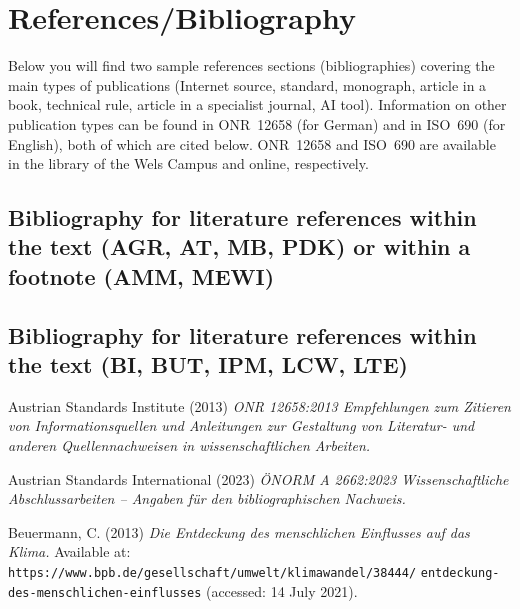 \chapter{References/Bibliography}
\label{sec: Bibliography}
Below you will find two sample references sections (bibliographies) covering the main types of publications (Internet source, standard, monograph, article in a book, technical rule, article in a specialist journal, AI tool). Information on other publication types can be found in ONR~12658 (for German) and in ISO~690 (for English), both of which are cited below. ONR~12658 and ISO~690 are available in the library of the Wels Campus and online, respectively.

\setlength{\parindent}{0mm}
\section{Bibliography for literature references within the text (AGR, AT, MB, PDK) or within a footnote (AMM, MEWI)}

\printbibliography[heading=none,env=bibliographyAlpha]
\nocite{*}

\vspace{1mm}


\section{Bibliography for literature references within the text (BI, BUT, IPM, LCW, LTE)}

Austrian Standards Institute (2013) \textit{ONR 12658:2013 Empfehlungen zum Zitieren von Informationsquellen und Anleitungen zur Gestaltung von Literatur- und anderen Quellennachweisen in wissenschaftlichen Arbeiten.}

\vspace{1mm}
Austrian Standards International (2023) \textit{ÖNORM A 2662:2023 Wissenschaftliche Abschlussarbeiten – Angaben für den bibliographischen Nachweis.}

\vspace{1mm}
Beuermann, C. (2013) \textit{Die Entdeckung des menschlichen Einflusses auf das Klima.} Available at: 
\texttt{https://www.bpb.de/gesellschaft/umwelt/klimawandel/38444/}
\texttt{entdeckung-des-menschlichen-einflusses} (accessed: 14 July 2021).


